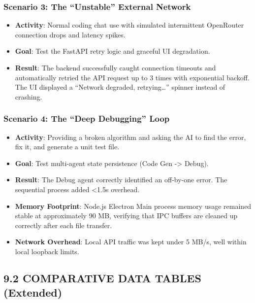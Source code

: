 \documentclass[
  12pt,
]{article}
\providecommand{\tightlist}{%
  \setlength{\itemsep}{0pt}\setlength{\parskip}{0pt}}
\begin{document}
\subsubsection{Scenario 3: The ``Unstable'' External
Network}\label{scenario-3-the-unstable-external-network}

\begin{itemize}
\tightlist
\item
  \textbf{Activity}: Normal coding chat use with simulated intermittent
  OpenRouter connection drops and latency spikes.
\item
  \textbf{Goal}: Test the FastAPI retry logic and graceful UI
  degradation.
\item
  \textbf{Result}: The backend successfully caught connection timeouts
  and automatically retried the API request up to 3 times with
  exponential backoff. The UI displayed a ``Network degraded,
  retrying\ldots{}'' spinner instead of crashing.
\end{itemize}

\subsubsection{Scenario 4: The ``Deep Debugging''
Loop}\label{scenario-4-the-deep-debugging-loop}

\begin{itemize}
\tightlist
\item
  \textbf{Activity}: Providing a broken algorithm and asking the AI to
  find the error, fix it, and generate a unit test file.
\item
  \textbf{Goal}: Test multi-agent state persistence (Code Gen
  -\textgreater{} Debug).
\item
  \textbf{Result}: The Debug agent correctly identified an off-by-one
  error. The sequential process added \textless1.5s overhead.
\item
  \textbf{Memory Footprint}: Node.js Electron Main process memory usage
  remained stable at approximately 90 MB, verifying that IPC buffers are
  cleaned up correctly after each file transfer.
\item
  \textbf{Network Overhead}: Local API traffic was kept under 5 MB/s,
  well within local loopback limits.
\end{itemize}

\subsection{9.2 COMPARATIVE DATA TABLES
(Extended)}\label{comparative-data-tables-extended}
\end{document}
